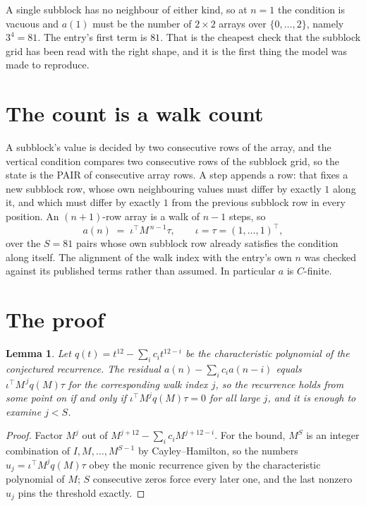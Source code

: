 \documentclass[11pt,a4paper]{article}
\theoremstyle{plain}
\newtheorem{lemma}[theorem]{Lemma}
\theoremstyle{definition}
\begin{document}
A single subblock has no neighbour of either kind, so at $n=1$ the condition is vacuous and
$a(1)$ must be the number of $2\times2$ arrays over $\{0,\dots,2\}$, namely
$3^{4}=81$. The entry's first term is $81$.
That is the cheapest check that the subblock grid has been read with the right shape, and it
is the first thing the model was made to reproduce.

\section{The count is a walk count}

A subblock's value is decided by two consecutive rows of the array, and the
vertical condition compares two consecutive rows of the subblock grid, so the state is the
PAIR of consecutive array rows. A step appends a row: that fixes a new subblock row, whose own
neighbouring values must differ by exactly $1$ along it, and which must differ by exactly
$1$ from the previous subblock row in every position. An $(n+1)$-row array is a walk of
$n-1$ steps, so
\[
a(n)\;=\;\iota^{\!\top}M^{\,n-1}\tau,\qquad\iota=\tau=(1,\dots,1)^{\!\top},
\]
over the $S=81$ pairs whose own subblock row already satisfies the condition along itself.
The alignment of the walk index with the entry's own $n$ was checked against its published
terms rather than assumed. In particular $a$ is $C$-finite.

\section{The proof}

\begin{lemma}\label{lem:crit}
Let $q(t)=t^{12}-\sum_i c_it^{12-i}$ be the characteristic polynomial of the
conjectured recurrence. The residual $a(n)-\sum_ic_ia(n-i)$ equals
$\iota^{\!\top}M^{\,j}q(M)\tau$ for the corresponding walk index $j$, so the recurrence
holds from some point on if and only if $\iota^{\!\top}M^{j}q(M)\tau=0$ for all large $j$,
and it is enough to examine $j<S$.
\end{lemma}

\begin{proof}
Factor $M^{j}$ out of $M^{j+12}-\sum_ic_iM^{j+12-i}$. For the bound, $M^{S}$
is an integer combination of $I,M,\dots,M^{S-1}$ by Cayley--Hamilton, so the numbers
$u_j=\iota^{\!\top}M^{j}q(M)\tau$ obey the monic recurrence given by the characteristic
polynomial of $M$; $S$ consecutive zeros force every later one, and the last nonzero $u_j$
pins the threshold exactly.
\end{proof}
\end{document}

